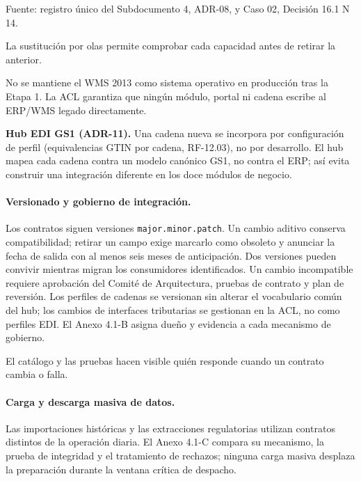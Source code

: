 {\footnotesize Fuente: registro único del Subdocumento 4, ADR-08, y Caso 02, Decisión 16.1 N\textdegree{} 14.\par}

La sustitución por olas permite comprobar cada capacidad antes de retirar la anterior.

No se mantiene el WMS 2013 como sistema operativo en producción tras la Etapa 1. La ACL garantiza que ningún módulo, portal ni cadena escribe al ERP/WMS legado directamente.

\textbf{Hub EDI GS1 (ADR-11).} Una cadena nueva se incorpora por configuración de perfil (equivalencias GTIN por cadena, RF-12.03), no por desarrollo. El hub mapea cada cadena contra un modelo canónico GS1, no contra el ERP; así evita construir una integración diferente en los doce módulos de negocio.

\paragraph{Versionado y gobierno de integración.}
\label{subsubsec:versionado-gobierno}

Los contratos siguen versiones \texttt{major.\allowbreak minor.\allowbreak patch}. Un cambio aditivo conserva compatibilidad; retirar un campo exige marcarlo como obsoleto y anunciar la fecha de salida con al menos seis meses de anticipación. Dos versiones pueden convivir mientras migran los consumidores identificados. Un cambio incompatible requiere aprobación del Comité de Arquitectura, pruebas de contrato y plan de reversión. Los perfiles de cadenas se versionan sin alterar el vocabulario común del hub; los cambios de interfaces tributarias se gestionan en la ACL, no como perfiles EDI. El Anexo 4.1-B asigna dueño y evidencia a cada mecanismo de gobierno.


El catálogo y las pruebas hacen visible quién responde cuando un contrato cambia o falla.

\paragraph{Carga y descarga masiva de datos.}
\label{subsubsec:carga-masiva}

Las importaciones históricas y las extracciones regulatorias utilizan contratos distintos de la operación diaria. El Anexo 4.1-C compara su mecanismo, la prueba de integridad y el tratamiento de rechazos; ninguna carga masiva desplaza la preparación durante la ventana crítica de despacho.



